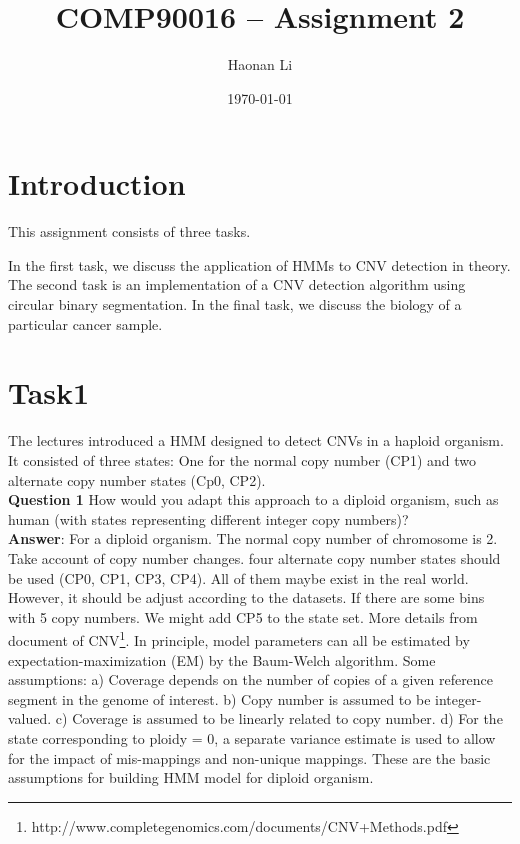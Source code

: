 \documentclass[a4paper]{article}
\title{\bfseries{COMP90016 -- Assignment 2 }}
\author{Haonan Li}
\date{\today}
\begin{document}
\maketitle

\section{Introduction}
\label{sec:introduction}

This assignment consists of three tasks. 

In the first task, we discuss the application of HMMs to CNV detection in theory. The second task is an implementation of a CNV detection algorithm using circular binary segmentation. In the final task, we discuss the biology of a particular cancer sample.

\section{Task1}

The lectures introduced a HMM designed to detect CNVs in a haploid organism. It consisted of three states: One for the normal copy number (CP1) and two alternate copy number states (Cp0, CP2).\\

\noindent\textbf{Question 1} How would you adapt this approach to a diploid organism, such as human (with states representing different integer copy numbers)? \\

\noindent\textbf{Answer}: For a diploid organism. The normal copy number of chromosome is 2. Take account of copy number changes. four alternate copy number states should be used (CP0, CP1, CP3, CP4). All of them maybe exist in the real world. However, it should be adjust according to the datasets. If there are some bins with 5 copy numbers. We might add CP5 to the state set. More details from document of CNV\footnote{http://www.completegenomics.com/documents/CNV+Methods.pdf}. In principle, model parameters can all be estimated by expectation-maximization (EM) by the Baum-Welch algorithm. Some assumptions: a) Coverage depends on the number of copies of a given reference segment in the genome of interest. b) Copy number is assumed to be integer-valued. c) Coverage is assumed to be linearly related to copy number. d) For the state corresponding to ploidy = 0, a separate variance estimate is used to allow for the impact of mis-mappings and non-unique mappings. These are the basic assumptions for building HMM model for diploid organism.
\\
\end{document}
